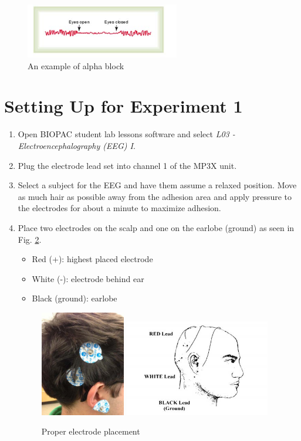 \documentclass{article}
\begin{document}
\begin{figure}[h]
\centering
\includegraphics[width=0.6\textwidth]{../images/EEG_3.jpg}	
\caption{An example of alpha block}
\label{alphablock}
\end{figure}

\section*{Setting Up for Experiment 1}
\begin{enumerate}
	\item Open BIOPAC student lab lessons software and select \textit{L03 - Electroencephalography (EEG) I}.
	\item Plug the electrode lead set into channel 1 of the MP3X unit.
	\item Select a subject for the EEG and have them assume a relaxed position. Move as much hair as possible away from the adhesion area and apply pressure to the electrodes for about a minute to maximize adhesion.
	\item Place two electrodes on the scalp and one on the earlobe (ground) as seen in Fig. \ref{electrodes}.
		\begin{itemize}
			\item Red (+): highest placed electrode
			\item White (-): electrode behind ear
			\item Black (ground): earlobe
		\end{itemize}
		
		 \begin{figure}[h]
	\centering\includegraphics[width=0.35\textwidth]{../images/EEG_5a.jpg}
	\includegraphics[width=0.6\textwidth]{../images/EEG_5b.jpg}		
		\caption{Proper electrode placement}
		\label{electrodes}
		\end{figure}
		

\end{enumerate}
\end{document}
